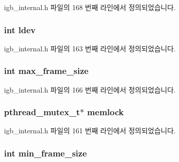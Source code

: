 igb\+\_\+internal.\+h 파일의 168 번째 라인에서 정의되었습니다.

\subsubsection[{\texorpdfstring{ldev}{ldev}}]{\setlength{\rightskip}{0pt plus 5cm}int ldev}\hypertarget{structadapter_ae57c5756a3672ea1541cbc6dfd283161}{}\label{structadapter_ae57c5756a3672ea1541cbc6dfd283161}


igb\+\_\+internal.\+h 파일의 163 번째 라인에서 정의되었습니다.

\subsubsection[{\texorpdfstring{max\+\_\+frame\+\_\+size}{max_frame_size}}]{\setlength{\rightskip}{0pt plus 5cm}int max\+\_\+frame\+\_\+size}\hypertarget{structadapter_a09c29b0090a82147afdb50ae0013b9c6}{}\label{structadapter_a09c29b0090a82147afdb50ae0013b9c6}


igb\+\_\+internal.\+h 파일의 166 번째 라인에서 정의되었습니다.

\subsubsection[{\texorpdfstring{memlock}{memlock}}]{\setlength{\rightskip}{0pt plus 5cm}pthread\+\_\+mutex\+\_\+t$\ast$ memlock}\hypertarget{structadapter_ac26455511b5639f92b1eadeae2f8e20e}{}\label{structadapter_ac26455511b5639f92b1eadeae2f8e20e}


igb\+\_\+internal.\+h 파일의 161 번째 라인에서 정의되었습니다.

\subsubsection[{\texorpdfstring{min\+\_\+frame\+\_\+size}{min_frame_size}}]{\setlength{\rightskip}{0pt plus 5cm}int min\+\_\+frame\+\_\+size}\hypertarget{structadapter_a027b06fbbd3bf1152365ce98101e4583}{}\label{structadapter_a027b06fbbd3bf1152365ce98101e4583}


